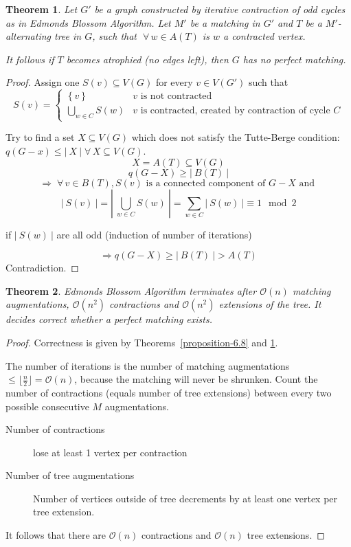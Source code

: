 \documentclass{article}
\newtheorem{theorem}{Theorem}
\newcommand{\card}[1]{\left|\:\!#1\:\!\right|}
\newcommand{\set}[1]{\left\{#1\right\}}
\newcommand{\fall}{\;\forall\,}
\begin{document}
\begin{theorem}\label{proposition-6.9}
  Let $G'$ be a graph constructed by iterative contraction of odd cycles as in Edmonds Blossom Algorithm. Let $M'$ be a matching in $G'$ and $T$ be a $M'$-alternating tree in $G$, such that $\fall w \in A(T)$ is $w$ a contracted vertex.

  It follows if $T$ becomes atrophied (no edges left), then $G$ has no perfect matching.
\end{theorem}

\begin{proof}
  Assign one $S(v) \subseteq V(G)$ for every $v \in V(G')$ such that
  \[
    S(v) = \begin{cases}
      \set{v}                 & v \text{ is not contracted} \\
      \bigcup_{w \in C} S(w)  & v \text{ is contracted, created by contraction of cycle $C$}
    \end{cases}
  \]

  Try to find a set $X \subseteq V(G)$ which does not satisfy the Tutte-Berge condition:
  $q (G-x) \leq \card{X} \fall X \subseteq V(G)$.
  \[
    X = A(T) \subseteq V(G)
  \] \[
    q(G-X) \geq \card{B(T)}
  \] \[
    \Rightarrow
      \fall v \in B(T),
        S(v) \text{ is a connected component of $G-X$ and
        }
  \] \[
    \card{S(v)} = \card{\bigcup_{w \in C} S(w)}
        = \sum_{w \in C} \card{S(w)}
        \equiv 1 \mod{2}
  \]
  \begin{center}
    if $\card{S(w)}$ are all odd (induction of number of iterations)
  \end{center}
  \[
    \Rightarrow q(G-X) \geq \card{B(T)} > A(T)
  \]
  Contradiction.
\end{proof}

\begin{theorem}\label{satz-6.10}
  Edmonds Blossom Algorithm terminates after $\mathcal{O}(n)$ matching augmentations,
  $\mathcal{O}(n^2)$ contractions and $\mathcal{O}(n^2)$ extensions of the tree.
  It decides correct whether a perfect matching exists.
\end{theorem}

\begin{proof}
  Correctness is given by Theorems~\ref{proposition-6.8} and \ref{proposition-6.9}.

  The number of iterations is the number of matching augmentations $\leq \lfloor \frac{n}2 \rfloor = \mathcal{O}(n)$, because the matching will never be shrunken.
  Count the number of contractions (equals number of tree extensions) between every two possible consecutive $M$ augmentations.

  \begin{description}
    \item[Number of contractions] lose at least 1 vertex per contraction
    \item[Number of tree augmentations]
      Number of vertices outside of tree decrements by at least one vertex per tree extension.
  \end{description}

  It follows that there are $\mathcal{O}(n)$ contractions and $\mathcal{O}(n)$ tree extensions.
\end{proof}
\end{document}
